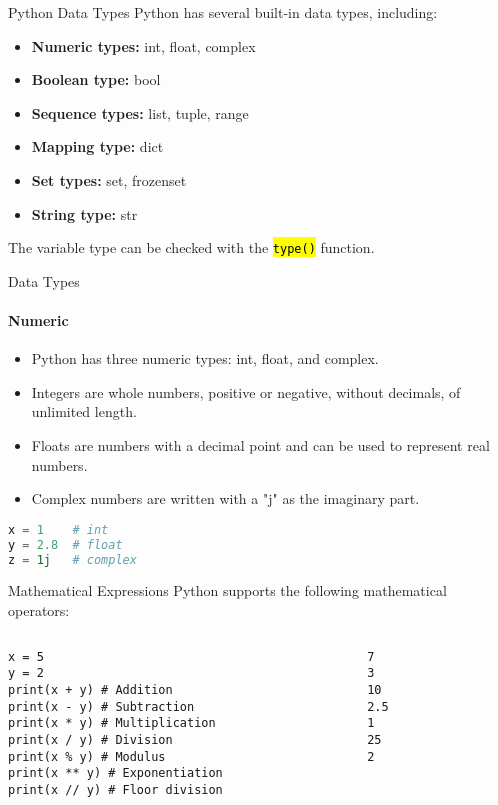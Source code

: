 \documentclass[
    aspectratio=169, 
    usepdftitle=false, 
    xcolor={dvipsnames},
    hyperref={
        colorlinks,
        linkcolor=black,
        urlcolor=blue}
    ]{beamer}
\let\OldTexttt\texttt
\renewcommand{\texttt}[1]{\OldTexttt{\hl{#1}}}%
\begin{document}
\begin{frame}[fragile]{Python Data Types}
    Python has several built-in data types, including:
    \begin{itemize}
        \item \textbf{Numeric types:} int, float, complex
        \item \textbf{Boolean type:} bool
        \item \textbf{Sequence types:} list, tuple, range
        \item \textbf{Mapping type:} dict
        \item \textbf{Set types:} set, frozenset
        \item \textbf{String type:} str
    \end{itemize}
    The variable type can be checked with the \texttt{type()} function.
\end{frame}



\begin{frame}[fragile]{Data Types}
    \framesubtitle{Numeric}
    \begin{itemize}
        \item Python has three numeric types: int, float, and complex.
        \item Integers are whole numbers, positive or negative, without decimals, of unlimited length.
        \item Floats are numbers with a decimal point and can be used to represent real numbers.
        \item Complex numbers are written with a "j" as the imaginary part.
    \end{itemize}
    \begin{lstlisting}[language=Python]
x = 1    # int
y = 2.8  # float
z = 1j   # complex
\end{lstlisting}
\end{frame}

\begin{frame}[fragile]{Mathematical Expressions}
    Python supports the following mathematical operators:
    \begin{columns}
        \begin{column}{0.5\textwidth}
            \begin{lstlisting}
x = 5
y = 2
print(x + y) # Addition
print(x - y) # Subtraction
print(x * y) # Multiplication
print(x / y) # Division
print(x % y) # Modulus
print(x ** y) # Exponentiation
print(x // y) # Floor division
    \end{lstlisting}
        \end{column}
        \begin{column}{0.4\textwidth}
\begin{lstlisting}[style=output]
7
3
10
2.5
1
25
2
\end{lstlisting}
\end{column}
\end{columns}
\end{frame}
\end{document}
